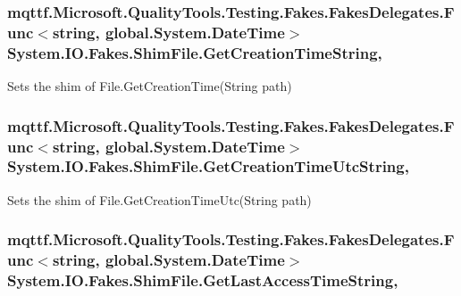\hypertarget{class_system_1_1_i_o_1_1_fakes_1_1_shim_file_aca2b6909f3890dffc7a9c75f6acded33}{
\subsubsection[{Get\-Creation\-Time\-String}]{\setlength{\rightskip}{0pt plus 5cm}mqttf.\-Microsoft.\-Quality\-Tools.\-Testing.\-Fakes.\-Fakes\-Delegates.\-Func$<$string, global.\-System.\-Date\-Time$>$ System.\-I\-O.\-Fakes.\-Shim\-File.\-Get\-Creation\-Time\-String\hspace{0.3cm}{\ttfamily [static]}, {\ttfamily [set]}}}\label{class_system_1_1_i_o_1_1_fakes_1_1_shim_file_aca2b6909f3890dffc7a9c75f6acded33}


Sets the shim of File.\-Get\-Creation\-Time(\-String path)

\hypertarget{class_system_1_1_i_o_1_1_fakes_1_1_shim_file_a50b878e1e36959708af2103331eac25e}{
\subsubsection[{Get\-Creation\-Time\-Utc\-String}]{\setlength{\rightskip}{0pt plus 5cm}mqttf.\-Microsoft.\-Quality\-Tools.\-Testing.\-Fakes.\-Fakes\-Delegates.\-Func$<$string, global.\-System.\-Date\-Time$>$ System.\-I\-O.\-Fakes.\-Shim\-File.\-Get\-Creation\-Time\-Utc\-String\hspace{0.3cm}{\ttfamily [static]}, {\ttfamily [set]}}}\label{class_system_1_1_i_o_1_1_fakes_1_1_shim_file_a50b878e1e36959708af2103331eac25e}


Sets the shim of File.\-Get\-Creation\-Time\-Utc(\-String path)

\hypertarget{class_system_1_1_i_o_1_1_fakes_1_1_shim_file_a932fe5500bb86d41fb0fe95d9824a8b9}{
\subsubsection[{Get\-Last\-Access\-Time\-String}]{\setlength{\rightskip}{0pt plus 5cm}mqttf.\-Microsoft.\-Quality\-Tools.\-Testing.\-Fakes.\-Fakes\-Delegates.\-Func$<$string, global.\-System.\-Date\-Time$>$ System.\-I\-O.\-Fakes.\-Shim\-File.\-Get\-Last\-Access\-Time\-String\hspace{0.3cm}{\ttfamily [static]}, {\ttfamily [set]}}}\label{class_system_1_1_i_o_1_1_fakes_1_1_shim_file_a932fe5500bb86d41fb0fe95d9824a8b9}


